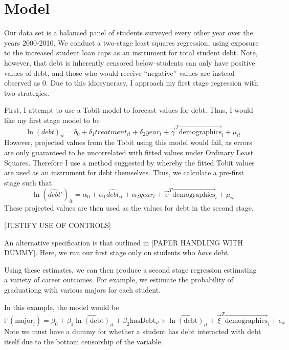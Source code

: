 \documentclass{article}
\begin{document}
	\section{Model}
	
	Our data set is a balanced panel of students surveyed every other year over the years 2000-2010. We conduct a two-stage least squares regression, using exposure to the increased student loan caps as an instrument for total student debt. Note, however, that debt is inherently censored below--students can only have positive values of debt, and those who would receive ``negative'' values are instead observed as 0. Due to this idiosyncrasy, I approach my first stage regression with two strategies.
	
	First, I attempt to use a Tobit model to forecast values for debt. Thus, I would like my first stage model to be $$\ln(debt)_{it} = \delta_0 + \delta_1 treatment_{it} + \delta_2 year_t + \vec{\gamma}^T \vec{\mbox{demographics}}_i + \mu_{it}$$ However, projected values from the Tobit using this model would fail, as errors are only guaranteed to be uncorrelated with fitted values under Ordinary Least Squares. Therefore I use a method suggested by \textcite{angrist2009} whereby the fitted Tobit values are used as an instrument for debt themselves. Thus, we calculate a pre-first stage such that $$\ln(\widehat{debt}')_{it} = \alpha_0 + \alpha_1 \widehat{debt}_{it} + \alpha_2 year_t + \vec{\upsilon}^T \vec{\mbox{demographics}}_i + \mu_{it}$$ These projected values are then used as the values for debt in the second stage. 
	
	[JUSTIFY USE OF CONTROLS]
	
	An alternative specification is that outlined in [PAPER HANDLING WITH DUMMY]. Here, we run our first stage only on students who \emph{have} debt. 
	
	
	Using these estimates, we can then produce a second stage regression estimating a variety of career outcomes. For example, we estimate the probability of graduationg with various majors for each student. 
	
	In this example, the model would be $$\mathbb{P}(\mbox{major}_i) = \beta_0 + \beta_1 \widehat{\ln(\mbox{debt})}_{it} + \beta_2 \mbox{hasDebt}_{it} \times \widehat{\ln(\mbox{debt})}_{it} + \vec{\xi}^T \vec{\mbox{demographics}}_i + \epsilon_{it}$$ Note we must have a dummy for whether a student has debt interacted with debt itself due to the bottom censorship of the variable. 
	
\end{document}
